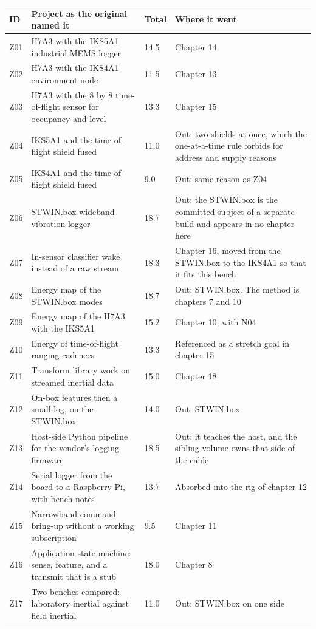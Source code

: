 \begin{table}[H]\centering\small
\begin{tabular}{p{9mm}p{70mm}p{11mm}p{55mm}}
\toprule
ID & Project as the original named it & Total & Where it went \\
\midrule
Z01 & H7A3 with the IKS5A1 industrial MEMS logger & 14.5 & Chapter 14 \\
Z02 & H7A3 with the IKS4A1 environment node & 11.5 & Chapter 13 \\
Z03 & H7A3 with the 8 by 8 time-of-flight sensor for occupancy and level & 13.3 & Chapter 15 \\
Z04 & IKS5A1 and the time-of-flight shield fused & 11.0 & Out: two shields at once, which the one-at-a-time rule forbids for address and supply reasons \\
Z05 & IKS4A1 and the time-of-flight shield fused & 9.0 & Out: same reason as Z04 \\
Z06 & STWIN.box wideband vibration logger & 18.7 & Out: the STWIN.box is the committed subject of a separate build and appears in no chapter here \\
Z07 & In-sensor classifier wake instead of a raw stream & 18.3 & Chapter 16, moved from the STWIN.box to the IKS4A1 so that it fits this bench \\
Z08 & Energy map of the STWIN.box modes & 18.7 & Out: STWIN.box. The method is chapters 7 and 10 \\
Z09 & Energy map of the H7A3 with the IKS5A1 & 15.2 & Chapter 10, with N04 \\
Z10 & Energy of time-of-flight ranging cadences & 13.3 & Referenced as a stretch goal in chapter 15 \\
Z11 & Transform library work on streamed inertial data & 15.0 & Chapter 18 \\
Z12 & On-box features then a small log, on the STWIN.box & 14.0 & Out: STWIN.box \\
Z13 & Host-side Python pipeline for the vendor's logging firmware & 18.5 & Out: it teaches the host, and the sibling volume owns that side of the cable \\
Z14 & Serial logger from the board to a Raspberry Pi, with bench notes & 13.7 & Absorbed into the rig of chapter 12 \\
Z15 & Narrowband command bring-up without a working subscription & 9.5 & Chapter 11 \\
Z16 & Application state machine: sense, feature, and a transmit that is a stub & 18.0 & Chapter 8 \\
Z17 & Two benches compared: laboratory inertial against field inertial & 11.0 & Out: STWIN.box on one side \\

\end{tabular}
\end{table}

